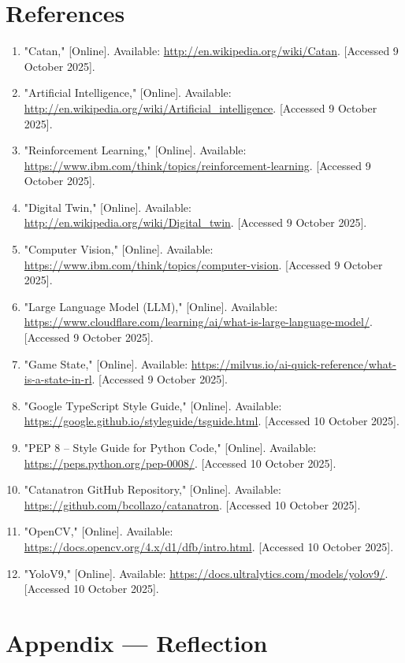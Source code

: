 \documentclass{article}
\begin{document}
\FloatBarrier

\section*{References}
\begin{enumerate}
    \item "Catan," [Online]. Available: \url{http://en.wikipedia.org/wiki/Catan}. [Accessed 9 October 2025].
    \item "Artificial Intelligence," [Online]. Available: \url{http://en.wikipedia.org/wiki/Artificial_intelligence}. [Accessed 9 October 2025].
    \item "Reinforcement Learning," [Online]. Available: \url{https://www.ibm.com/think/topics/reinforcement-learning}. [Accessed 9 October 2025].
    \item "Digital Twin," [Online]. Available: \url{http://en.wikipedia.org/wiki/Digital_twin}. [Accessed 9 October 2025].
    \item "Computer Vision," [Online]. Available: \url{https://www.ibm.com/think/topics/computer-vision}. [Accessed 9 October 2025].
    \item "Large Language Model (LLM)," [Online]. Available: \url{https://www.cloudflare.com/learning/ai/what-is-large-language-model/}. [Accessed 9 October 2025].
    \item "Game State," [Online]. Available: \url{https://milvus.io/ai-quick-reference/what-is-a-state-in-rl}. [Accessed 9 October 2025].
    \item "Google TypeScript Style Guide," [Online]. Available: \url{https://google.github.io/styleguide/tsguide.html}. [Accessed 10 October 2025].
    \item "PEP 8 -- Style Guide for Python Code," [Online]. Available: \url{https://peps.python.org/pep-0008/}. [Accessed 10 October 2025].
    \item "Catanatron GitHub Repository," [Online]. Available: \url{https://github.com/bcollazo/catanatron}. [Accessed 10 October 2025].
    \item "OpenCV," [Online]. Available: \url{https://docs.opencv.org/4.x/d1/dfb/intro.html}. [Accessed 10 October 2025].
    \item "YoloV9," [Online]. Available: \url{https://docs.ultralytics.com/models/yolov9/}. [Accessed 10 October 2025].
\end{enumerate}
\newpage{}

\section*{Appendix --- Reflection}

\end{document}
